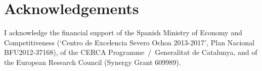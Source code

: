 \documentclass{article}
\begin{document}
\section*{Acknowledgements}

I acknowledge the financial support of the Spanish Ministry of Economy and
Competitiveness (‘Centro de Excelencia Severo Ochoa 2013-2017’, Plan
Nacional BFU2012-37168), of the CERCA Programme~/~Generalitat de
Catalunya, and of the European Research Council (Synergy Grant 609989).






\end{document}
